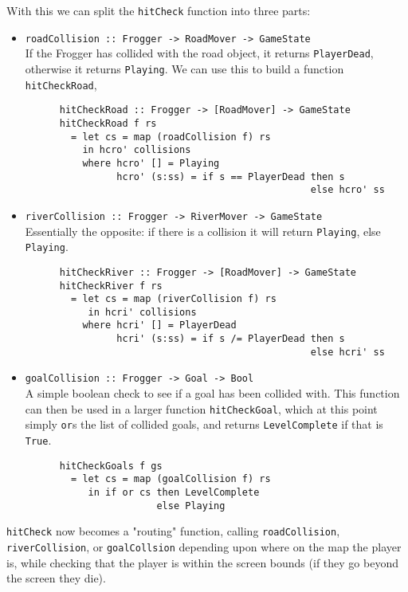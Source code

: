 \documentclass[12pt, a4paper]{report}
\begin{document}
\par

With this we can split the \verb|hitCheck| function into three parts:
\begin{itemize}
  \item \verb|roadCollision :: Frogger -> RoadMover -> GameState|\\
    If the Frogger has collided with the road object, it returns \verb|PlayerDead|, otherwise it returns \verb|Playing|.
    We can use this to build a function \verb|hitCheckRoad|,
    \begin{lstlisting}
      hitCheckRoad :: Frogger -> [RoadMover] -> GameState
      hitCheckRoad f rs
        = let cs = map (roadCollision f) rs
          in hcro' collisions
          where hcro' [] = Playing
                hcro' (s:ss) = if s == PlayerDead then s
                                                  else hcro' ss
    \end{lstlisting}
  \item \verb|riverCollision :: Frogger -> RiverMover -> GameState|\\
    Essentially the opposite: if there is a collision it will return \verb|Playing|, else \verb|Playing|.
    \begin{lstlisting}
      hitCheckRiver :: Frogger -> [RoadMover] -> GameState
      hitCheckRiver f rs
        = let cs = map (riverCollision f) rs
           in hcri' collisions
          where hcri' [] = PlayerDead
                hcri' (s:ss) = if s /= PlayerDead then s
                                                  else hcri' ss
    \end{lstlisting}
  \item \verb|goalCollision :: Frogger -> Goal -> Bool|\\
    A simple boolean check to see if a goal has been collided with.
    This function can then be used in a larger function \verb|hitCheckGoal|, which at this point simply \verb|or|s the list of collided goals, and returns \verb|LevelComplete| if that is \verb|True|.
    \begin{lstlisting}
      hitCheckGoals f gs
        = let cs = map (goalCollision f) rs
           in if or cs then LevelComplete
                       else Playing
    \end{lstlisting}
\end{itemize}

\verb|hitCheck| now becomes a "routing" function, calling \verb|roadCollision|, \verb|riverCollision|, or \verb|goalCollsion| depending upon where on the map the player is, while checking that the player is within the screen bounds (if they go beyond the screen they die).
\end{document}
